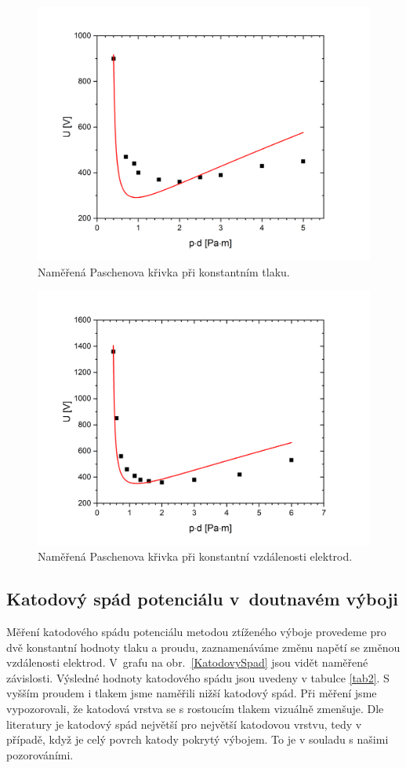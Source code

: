 \documentclass[a4paper,12pt]{article}
\begin{document}
\begin{figure}[h!]
	\centering
	\includegraphics[width=150mm]{tlakfixed.png}
	\caption{Naměřená Paschenova křivka při konstantním tlaku.}
	\label{tlakfixed}
\end{figure}


\begin{figure}[h!]
	\centering
	\includegraphics[width=150mm]{dfixed.png}
	\caption{Naměřená Paschenova křivka při konstantní vzdálenosti elektrod.}
	\label{dfixed}
\end{figure}

\clearpage
\subsection{Katodový spád potenciálu v~doutnavém výboji}
Měření katodového spádu potenciálu metodou ztíženého výboje provedeme pro dvě konstantní hodnoty tlaku a proudu, 
zaznamenáváme změnu napětí se změnou vzdálenosti elektrod. V~grafu na 
obr.~\ref{KatodovySpad} jsou vidět naměřené závislosti. Výsledné hodnoty 
katodového spádu jsou uvedeny v tabulce \ref{tab2}. S vyšším proudem i tlakem
jsme naměřili nižší katodový spád. Při měření jsme vypozorovali, 
že katodová vrstva se s rostoucím tlakem vizuálně zmenšuje. Dle literatury je katodový spád největší pro největší katodovou vrstvu, tedy v případě, když je celý povrch katody pokrytý výbojem. To je v souladu s našimi pozorováními.
\end{document}
